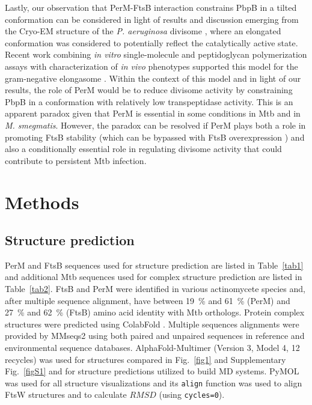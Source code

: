 \documentclass[pdflatex,sn-nature]{sn-jnl}%
\newcommand\mtb{Mtb}
\newcommand\msmeg{\textit{M. smegmatis}}
\newcommand\pa{\textit{P. aeruginosa}}
\begin{document}
Lastly, our observation that PerM-FtsB interaction constrains PbpB in a tilted conformation can be considered in light of results and discussion emerging from the Cryo-EM structure of the \pa{} divisome \citep{kashammerCryoEMStructureBacterial2023}, where an elongated conformation was considered to potentially reflect the catalytically active state.
Recent work combining \textit{in vitro} single-molecule and peptidoglycan polymerization assays with characterization of \textit{in vivo} phenotypes supported this model for the gram-negative elongasome \citep{shlosmanAllostericActivationCell2023}.
Within the context of this model and in light of our results, the role of PerM would be to reduce divisome activity by constraining PbpB in a conformation with relatively low transpeptidase activity.
This is an apparent paradox given that PerM is essential in some conditions in \mtb{} and in \msmeg{}.
However, the paradox can be resolved if PerM plays both a role in promoting FtsB stability (which can be bypassed with FtsB overexpression \citep{wangPersistentMycobacteriumTuberculosis2019}) and also a conditionally essential role in regulating divisome activity that could contribute to persistent \mtb{} infection.

\section{Methods}

\subsection{Structure prediction}

PerM and FtsB sequences used for structure prediction are listed in Table~\ref{tab1} and additional \mtb{} sequences used for complex structure prediction are listed in Table~\ref{tab2}.
FtsB and PerM were identified in various actinomycete species and, after multiple sequence alignment, have between \qty{19}{\percent} and \qty{61}{\percent} (PerM) and  \qty{27}{\percent} and \qty{62}{\percent} (FtsB) amino acid identity with \mtb{} orthologs.
Protein complex structures were predicted using ColabFold \citep{mirditaColabFoldMakingProtein2022}. Multiple sequences alignments were provided by MMseqs2 \citep{steineggerMMseqs2EnablesSensitive2017} using both paired and unpaired sequences in reference and environmental sequence databases.
AlphaFold-Multimer \citep{evansProteinComplexPrediction2022} (Version 3, Model 4, 12 recycles) was used for structures compared in Fig.~\ref{fig1} and Supplementary Fig.~\ref{figS1} and for structure predictions utilized to build MD systems.
PyMOL \citep{delanoPymolOpensourceMolecular2002} was used for all structure visualizations and its \verb|align| function was used to align FtsW structures and to calculate $RMSD$ (using \verb|cycles=0|).
\end{document}
